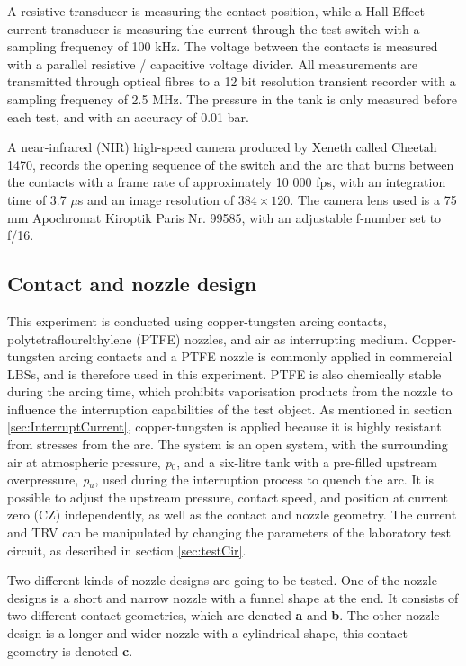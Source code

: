 \documentclass[10pt,b5paper,twoside]{article}
\begin{document}
A resistive transducer is measuring the contact position, while a Hall Effect current transducer is measuring the current through the test switch with a sampling frequency of 100 kHz. The voltage between the contacts is measured with a parallel resistive / capacitive voltage divider. All measurements are transmitted through optical fibres to a 12 bit resolution transient recorder with a sampling frequency of 2.5 MHz. The pressure in the tank is only measured before each test, and with an accuracy of 0.01 bar. 

A near-infrared (NIR) high-speed camera produced by Xeneth called Cheetah 1470, records the opening sequence of the switch and the arc that burns between the contacts with a frame rate of approximately 10 000 fps, with an integration time of 3.7 $\mu$s and an image resolution of $384 \times 120$. The camera lens used is a 75 mm Apochromat Kiroptik Paris Nr. 99585, with an adjustable f-number set to f/16. %

\subsection{Contact and nozzle design} \label{sec:testSwitchandContact}
This experiment is conducted using copper-tungsten arcing contacts, polytetraflourelthylene (PTFE) nozzles, and air as interrupting medium. Copper-tungsten arcing contacts and a PTFE nozzle is commonly applied in commercial LBSs, and is therefore used in this experiment. PTFE is also chemically stable during the arcing time, which prohibits vaporisation products from the nozzle to influence the interruption capabilities of the test object. As mentioned in section \ref{sec:InterruptCurrent}, copper-tungsten is applied because it is highly resistant from stresses from the arc. The system is an open system, with the surrounding air at atmospheric pressure, \textit{p$_0$}, and a six-litre tank with a pre-filled upstream overpressure, \textit{p$_u$}, used during the interruption process to quench the arc. It is possible to adjust the upstream pressure, contact speed, and position at current zero (CZ) independently, as well as the contact and nozzle geometry. The current and TRV can be manipulated by changing the parameters of the laboratory test circuit, as described in section \ref{sec:testCir}.

Two different kinds of nozzle designs are going to be tested. One of the nozzle designs is a short and narrow nozzle with a funnel shape at the end. It consists of two different contact geometries, which are denoted \textbf{a} and \textbf{b}. The other nozzle design is a longer and wider nozzle with a cylindrical shape, this contact geometry is denoted \textbf{c}. 
\end{document}
